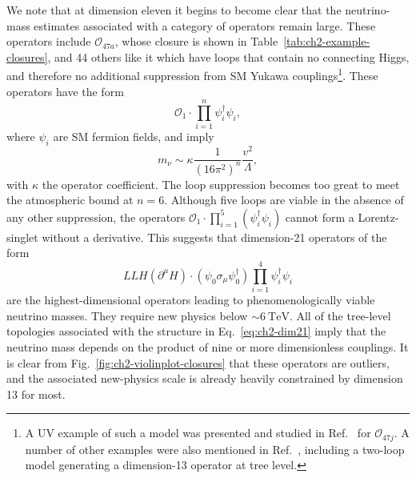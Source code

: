 We note that at dimension eleven it begins to become clear that the
neutrino-mass estimates associated with a category of operators remain large.
These operators include $\mathcal{O}_{47a}$, whose closure is shown in
Table~\ref{tab:ch2-example-closures}, and 44 others like it which have loops that
contain no connecting Higgs, and therefore no additional suppression from SM
Yukawa couplings\footnote{A UV example of such a model was presented and studied
  in Ref.~\cite{Gargalionis:2019drk} for $\mathcal{O}_{47j}$. A number of other
  examples were also mentioned in Ref.~\cite{Babu:2019mfe}, including a two-loop
  model generating a dimension-13 operator at tree level.}. These operators have
the form
\begin{equation}
  \label{eq:ch2-unsuppressed-ops}
\mathcal{O}_{1} \cdot \prod_{i=1}^{n} \psi_{i}^{\dagger} \psi_{i},
\end{equation}
where $\psi_{i}$ are SM fermion fields, and imply
\begin{equation}
  m_{\nu} \sim \kappa \frac{1}{(16\pi^{2})^{n}} \frac{v^{2}}{\Lambda},
\end{equation}
with $\kappa$ the operator coefficient. The loop suppression becomes too great
to meet the atmospheric bound at $n=6$. Although five loops are viable in the
absence of any other suppression, the operators
$\mathcal{O}_{1} \cdot \prod_{i=1}^{5} (\psi_{i}^{\dagger} \psi_{i})$ cannot
form a Lorentz-singlet without a derivative. This suggests that dimension-21
operators of the form
\begin{equation}
  \label{eq:ch2-dim21}
  LLH(\partial^{\mu}H) \cdot (\psi_{0} \sigma_{\mu} \psi_{0}^{\dagger}) \prod_{i=1}^{4} \psi_{i}^{\dagger} \psi_{i}
\end{equation}
are the highest-dimensional operators leading to phenomenologically viable
neutrino masses. They require new physics below $\sim 6~\text{TeV}$. All of the
tree-level topologies associated with the structure in Eq.~\eqref{eq:ch2-dim21}
imply that the neutrino mass depends on the product of nine or more
dimensionless couplings. It is clear from Fig.~\ref{fig:ch2-violinplot-closures}
that these operators are outliers, and the associated new-physics scale is
already heavily constrained by dimension 13 for most.


